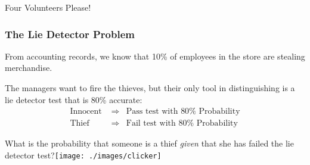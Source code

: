 \documentclass[handout]{beamer}
\begin{document}
%
%
%
%
%
\begin{frame}
\centering \Huge Four Volunteers Please!

\end{frame}
\begin{frame}
\frametitle{The Lie Detector Problem}
\begin{block}{From accounting records, we know that 10\% of employees in the store are stealing merchandise.}\end{block}
\begin{block}{The managers want to fire the thieves, but their only tool in distinguishing is a lie detector test that is 80\% accurate:}
	\begin{eqnarray*}
	\mbox{Innocent } &\Rightarrow& \mbox{Pass test with } 80\% \mbox{ Probability}\\
	\mbox{Thief } &\Rightarrow& \mbox{Fail test with } 80\% \mbox{ Probability}
	\end{eqnarray*}
\end{block}

\pause
\vspace{0.2in}
\begin{alertblock}{What is the probability that someone is a thief \emph{given} that she has failed the lie detector test?\hfill\texttt{[image: ./images/clicker]} }
\end{alertblock}

\end{frame}
\end{document}
